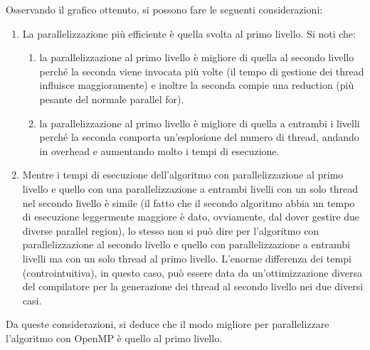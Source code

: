 \documentclass[10pt,twocolumn,letterpaper]{article}
\begin{document}
Osservando il grafico ottenuto, si possono fare le seguenti considerazioni:
\begin{enumerate}
\item{La parallelizzazione più efficiente è quella svolta al primo livello. Si noti che:
\begin{enumerate}
\item{la parallelizzazione al primo livello è migliore di quella al secondo livello perché la seconda viene invocata più volte (il tempo di gestione dei thread influisce maggioramente) e inoltre la seconda compie una reduction (più pesante del normale parallel for).}
\item{la parallelizzazione al primo livello è migliore di quella a entrambi i livelli perché la seconda comporta un'esplosione del numero di thread, andando in overhead e aumentando molto i tempi di esecuzione.}
\end{enumerate}}
\item{Mentre i tempi di esecuzione dell'algoritmo con parallelizzazione al primo livello e quello con una parallelizzazione a entrambi livelli con un solo thread nel secondo livello è simile (il fatto che il secondo algoritmo abbia un tempo di esecuzione leggermente maggiore è dato, ovviamente, dal dover gestire due diverse parallel region), lo stesso non si può dire per l'algoritmo con parallelizzazione al secondo livello e quello con parallelizzazione a entrambi livelli ma con un solo thread al primo livello. L'enorme differenza dei tempi (controintuitiva), in questo caso, può essere data da un'ottimizzazione diversa del compilatore per la generazione dei thread al secondo livello nei due diversi casi.}
\end{enumerate}

Da queste considerazioni, si deduce che il modo migliore per parallelizzare l'algoritmo con OpenMP è quello al primo livello.
\end{document}
